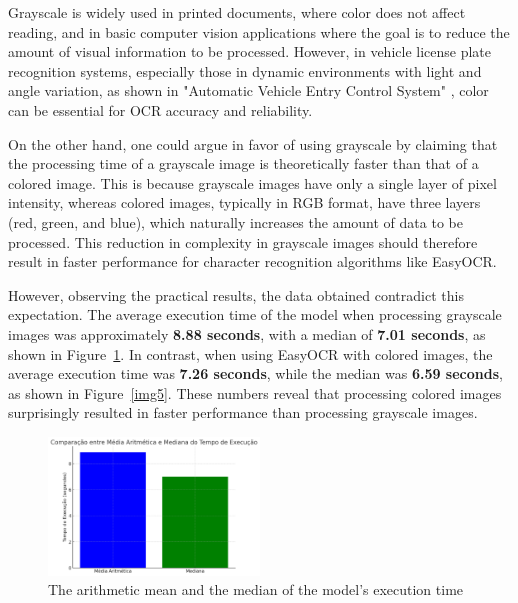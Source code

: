 \documentclass[conference]{IEEEtran}
\begin{document}
	Grayscale is widely used in printed documents, where color does not affect reading, and in basic computer vision applications where the goal is to reduce the amount of visual information to be processed. However, in vehicle license plate recognition systems, especially those in dynamic environments with light and angle variation, as shown in "Automatic Vehicle Entry Control System" \cite{b9}, color can be essential for OCR accuracy and reliability.
	
	On the other hand, one could argue in favor of using grayscale by claiming that the processing time of a grayscale image is theoretically faster than that of a colored image. This is because grayscale images have only a single layer of pixel intensity, whereas colored images, typically in RGB format, have three layers (red, green, and blue), which naturally increases the amount of data to be processed. This reduction in complexity in grayscale images should therefore result in faster performance for character recognition algorithms like EasyOCR.
	
	However, observing the practical results, the data obtained contradict this expectation. The average execution time of the model when processing grayscale images was approximately \textbf{8.88 seconds}, with a median of \textbf{7.01 seconds}, as shown in Figure~\ref{img8}. In contrast, when using EasyOCR with colored images, the average execution time was \textbf{7.26 seconds}, while the median was \textbf{6.59 seconds}, as shown in Figure~\ref{img5}. These numbers reveal that processing colored images surprisingly resulted in faster performance than processing grayscale images.
	
	\begin{figure}[htbp]
		\centerline{\includegraphics[width=0.5\textwidth]{img8.png}}
		\caption{The arithmetic mean and the median of the model's execution time}
		\label{img8}
	\end{figure}
	
\end{document}
